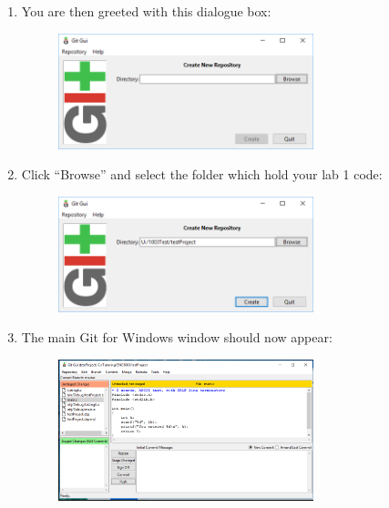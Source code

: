 \documentclass{lab}
\begin{document}
\begin{task}{}{}
\begin{enumerate}
\item You are then greeted with this dialogue box:

\begin{figure}[H]
\begin{center}
\includegraphics[width=0.7\textwidth]{Wk1Images/git3}
\end{center}
\end{figure}

\item Click ``Browse'' and select the folder which hold your lab 1 code:

\begin{figure}[H]
\begin{center}
\includegraphics[width=0.7\textwidth]{Wk1Images/git4}
\end{center}
\end{figure}

\pagebreak

\item The main Git for Windows window should now appear:

\begin{figure}[H]
\begin{center}
\includegraphics[width=0.7\textwidth]{Wk1Images/gitMainWindow}
\end{center}
\end{figure}


\end{enumerate}
\end{task}
\end{document}
